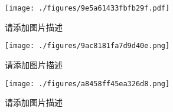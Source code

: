 
\begin{figure}[ht]
\centering
\texttt{[image: ./figures/9e5a61433fbfb29f.pdf]}
\caption{请添加图片描述} \label{fig_test2_1}
\end{figure}

\begin{figure}[ht]
\centering
\texttt{[image: ./figures/9ac8181fa7d9d40e.png]}
\caption{请添加图片描述} \label{fig_test2_2}
\end{figure}

\begin{figure}[ht]
\centering
\texttt{[image: ./figures/a8458ff45ea326d8.png]}
\caption{请添加图片描述} \label{fig_test2_3}
\end{figure}